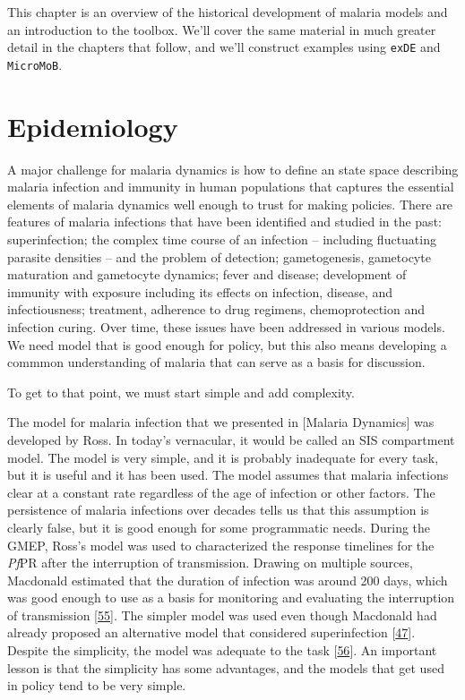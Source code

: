 \documentclass[
]{book}
\begin{document}
This chapter is an overview of the historical development of malaria models and an introduction to the toolbox. We'll cover the same material in much greater detail in the chapters that follow, and we'll construct examples using \texttt{exDE} and \texttt{MicroMoB}.

\hypertarget{epidemiology}{%
\section{Epidemiology}\label{epidemiology}}

A major challenge for malaria dynamics is how to define an state space describing malaria infection and immunity in human populations that captures the essential elements of malaria dynamics well enough to trust for making policies.
There are features of malaria infections that have been identified and studied in the past: superinfection; the complex time course of an infection -- including fluctuating parasite densities -- and the problem of detection; gametogenesis, gametocyte maturation and gametocyte dynamics; fever and disease; development of immunity with exposure including its effects on infection, disease, and infectiousness; treatment, adherence to drug regimens, chemoprotection and infection curing. Over time, these issues have been addressed in various models.
We need model that is good enough for policy, but this also means developing a commmon understanding of malaria that can serve as a basis for discussion.

To get to that point, we must start simple and add complexity.

The model for malaria infection that we presented in {[}Malaria Dynamics{]} was developed by Ross. In today's vernacular, it would be called an SIS compartment model. The model is very simple, and it is probably inadequate for every task, but it is useful and it has been used. The model assumes that malaria infections clear at a constant rate regardless of the age of infection or other factors. The persistence of malaria infections over decades tells us that this assumption is clearly false, but it is good enough for some programmatic needs. During the GMEP, Ross's model was used to characterized the response timelines for the \emph{Pf}PR after the interruption of transmission. Drawing on multiple sources, Macdonald estimated that the duration of infection was around 200 days, which was good enough to use as a basis for monitoring and evaluating the interruption of transmission {[}\protect\hyperlink{ref-MacdonaldG1964MalariaParasite}{55}{]}. The simpler model was used even though Macdonald had already proposed an alternative model that considered superinfection {[}\protect\hyperlink{ref-MacdonaldG1950Superinfection}{47}{]}. Despite the simplicity, the model was adequate to the task {[}\protect\hyperlink{ref-SmithDL2009EndemicityResponse}{56}{]}. An important lesson is that the simplicity has some advantages, and the models that get used in policy tend to be very simple.
\end{document}
